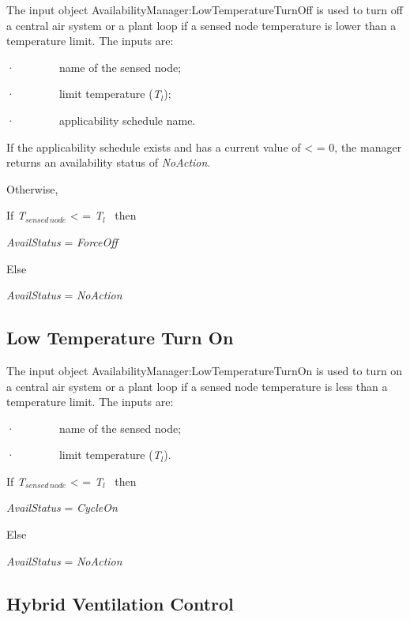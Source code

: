 The input object AvailabilityManager:LowTemperatureTurnOff is used to turn off a central air system or a plant loop if a sensed node temperature is lower than a temperature limit. The inputs are:

·~~~~~~~~name of the sensed node;

·~~~~~~~~limit temperature (\emph{T\(_{l}\)});

·~~~~~~~~applicability schedule name.

If the applicability schedule exists and has a current value of \textless{} = 0, the manager returns an availability status of \emph{NoAction}.

Otherwise,

If \emph{T\(_{sensed\, node}\)} \textless{} = \emph{T\(_{l}\)}~ then

\emph{AvailStatus} = \emph{ForceOff}

Else

\emph{AvailStatus} = \emph{NoAction}

\subsection{Low Temperature Turn On}\label{low-temperature-turn-on}

The input object AvailabilityManager:LowTemperatureTurnOn is used to turn on a central air system or a plant loop if a sensed node temperature is less than a temperature limit. The inputs are:

·~~~~~~~~name of the sensed node;

·~~~~~~~~limit temperature (\emph{T\(_{l}\)}).

If \emph{T\(_{sensed\, node}\)} \textless{} = \emph{T\(_{l}\)}~ then

\emph{AvailStatus} = \emph{CycleOn}

Else

\emph{AvailStatus} = \emph{NoAction}

\subsection{Hybrid Ventilation Control}\label{hybrid-ventilation-control}

